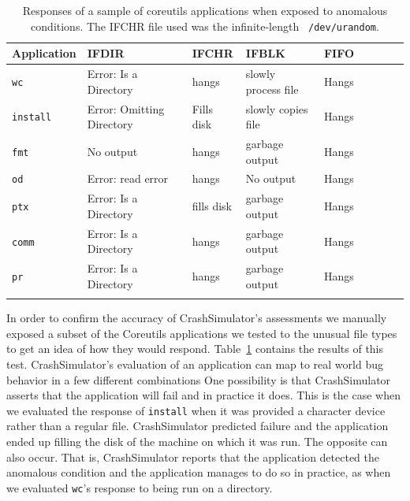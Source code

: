 \begin{table}[t]
    \scriptsize{}
    \begin{tabular}{l  l  l  l  l  l  l  l  l}
    \toprule{}
        Application         & IFDIR                     & IFCHR       & IFBLK                & FIFO \\
\hline
        {\tt wc}            & Error: Is a Directory     & hangs       & slowly process file  & Hangs\\
        {\tt install}       & Error: Omitting Directory & Fills disk  & slowly copies file   & Hangs\\
        {\tt fmt}           & No output                 & hangs       & garbage output       & Hangs\\
        {\tt od}            & Error: read error         & hangs       & No output            & Hangs\\
        {\tt ptx}           & Error: Is a Directory     & fills disk  & garbage output       & Hangs\\
        {\tt comm}          & Error: Is a Directory     & hangs       & garbage output       & Hangs\\
        {\tt pr}            & Error: Is a Directory     & hangs       & garbage output       & Hangs\\
\hline
    \bottomrule{}
    \end{tabular}
    \caption{Responses of a sample of coreutils applications when exposed to
      anomalous conditions.  The IFCHR file used was the infinite-length {\tt
        /dev/urandom}.}
    \label{table:applicationresponses}
\end{table}


In order to confirm the accuracy of CrashSimulator's assessments we manually
exposed a subset of the Coreutils applications we tested to the unusual file
types to get an idea of how they would respond.
Table~\ref{table:applicationresponses} contains the results of this test.
CrashSimulator's evaluation of an application can map to real world bug behavior
in a few different combinations
One
possibility is that CrashSimulator asserts that the application will fail
and in practice it does.  This is the case when we evaluated
the response of  {\tt install} when it was provided a character device
rather than a regular file. CrashSimulator predicted failure and the
application ended up filling the disk of the machine on which it was run.  The
opposite can also occur.  That is, CrashSimulator reports that the
application detected the anomalous condition and the application manages to
do so in practice,  as when we evaluated {\tt wc}'s response to
being run on a directory.

